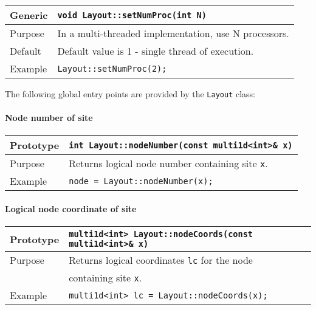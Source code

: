 \documentclass[12pt,letterpaper]{article}
\begin{document}
\begin{flushleft}
  \begin{tabular}{|l|l|}
  \hline
  Generic      & \verb|void Layout::setNumProc(int N)|\\
  \hline
  Purpose      & In a multi-threaded implementation, use N processors. \\
  \hline
  Default      & Default value is 1 - single thread of execution. \\
  \hline
  Example  & \verb|Layout::setNumProc(2);| \\
   \hline
 \end{tabular}
\end{flushleft}

        
The following global entry points are provided by the \verb|Layout| class:

\paragraph{Node number of site}

\begin{flushleft}
  \begin{tabular}{|l|l|}
  \hline
  Prototype      & \verb|int Layout::nodeNumber(const multi1d<int>& x)|\\
    \hline
  Purpose        & Returns logical node number containing site \verb|x|. \\
\hline
  Example  & \verb|node = Layout::nodeNumber(x);| \\
   \hline
 \end{tabular}
\end{flushleft}

\paragraph{Logical node coordinate of site}

\begin{flushleft}
  \begin{tabular}{|l|l|}
  \hline
  Prototype      & \verb|multi1d<int> Layout::nodeCoords(const multi1d<int>& x)|\\
    \hline
  Purpose        & Returns logical coordinates \verb|lc| for the node \\
                 & containing site \verb|x|. \\
\hline
  Example  & \verb|multi1d<int> lc = Layout::nodeCoords(x);| \\
   \hline
 \end{tabular}
\end{flushleft}
\end{document}
